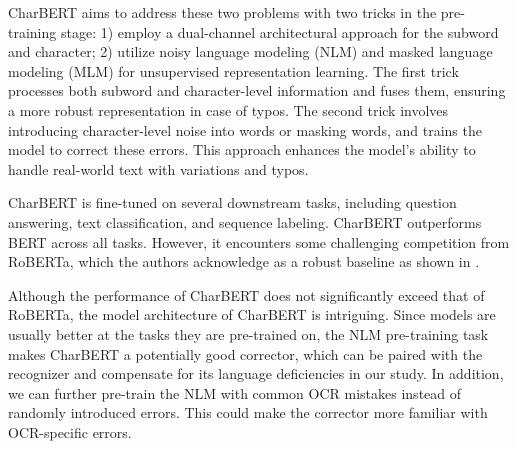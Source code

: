 
CharBERT aims to address these two problems with two tricks in the pre-training stage: 1) employ a dual-channel architectural approach for the subword and character; 2) utilize noisy language modeling (NLM) and masked language modeling (MLM) for unsupervised representation learning. The first trick processes both subword and character-level information and fuses them, ensuring a more robust representation in case of typos. The second trick involves introducing character-level noise into words or masking words, and trains the model to correct these errors. This approach enhances the model's ability to handle real-world text with variations and typos. 

CharBERT is fine-tuned on several downstream tasks, including question answering, text classification, and sequence labeling. CharBERT outperforms BERT across all tasks. However, it encounters some challenging competition from RoBERTa, which the authors acknowledge as a robust baseline as shown in .


Although the performance of CharBERT does not significantly exceed that of RoBERTa, the model architecture of CharBERT is intriguing. Since models are usually better at the tasks they are pre-trained on, the NLM pre-training task makes CharBERT a potentially good corrector, which can be paired with the recognizer and compensate for its language deficiencies in our study. In addition, we can further pre-train the NLM with common OCR mistakes instead of randomly introduced errors. This could make the corrector more familiar with OCR-specific errors.

